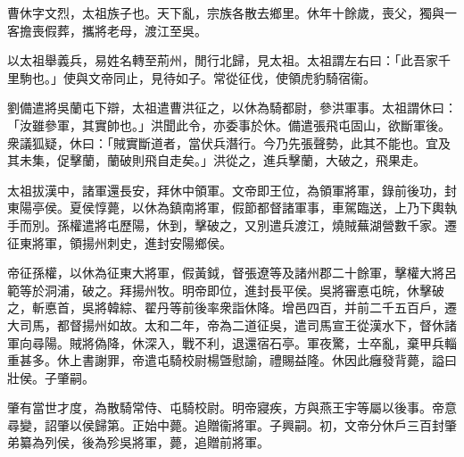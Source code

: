 \begin{pinyinscope}
 
 
 曹休字文烈，太祖族子也。天下亂，宗族各散去鄉里。休年十餘歲，喪父，獨與一客擔喪假葬，攜將老母，渡江至吳。
 
 
 以太祖舉義兵，易姓名轉至荊州，閒行北歸，見太祖。太祖謂左右曰：「此吾家千里駒也。」使與文帝同止，見待如子。常從征伐，使領虎豹騎宿衞。
 
 
 
 
 劉備遣將吳蘭屯下辯，太祖遣曹洪征之，以休為騎都尉，參洪軍事。太祖謂休曰：「汝雖參軍，其實帥也。」洪聞此令，亦委事於休。備遣張飛屯固山，欲斷軍後。衆議狐疑，休曰：「賊實斷道者，當伏兵潛行。今乃先張聲勢，此其不能也。宜及其未集，促擊蘭，蘭破則飛自走矣。」洪從之，進兵擊蘭，大破之，飛果走。
 
 
太祖拔漢中，諸軍還長安，拜休中領軍。文帝即王位，為領軍將軍，錄前後功，封東陽亭侯。夏侯惇薨，以休為鎮南將軍，假節都督諸軍事，車駕臨送，上乃下輿執手而別。孫權遣將屯歷陽，休到，擊破之，又別遣兵渡江，燒賊蕪湖營數千家。遷征東將軍，領揚州刺史，進封安陽鄉侯。
 
 
帝征孫權，以休為征東大將軍，假黃鉞，督張遼等及諸州郡二十餘軍，擊權大將呂範等於洞浦，破之。拜揚州牧。明帝即位，進封長平侯。吳將審悳屯皖，休擊破之，斬悳首，吳將韓綜、翟丹等前後率衆詣休降。增邑四百，并前二千五百戶，遷大司馬，都督揚州如故。太和二年，帝為二道征吳，遣司馬宣王從漢水下，督休諸軍向尋陽。賊將偽降，休深入，戰不利，退還宿石亭。軍夜驚，士卒亂，棄甲兵輜重甚多。休上書謝罪，帝遣屯騎校尉楊曁慰諭，禮賜益隆。休因此癰發背薨，謚曰壯侯。子肇嗣。
 
 
肇有當世才度，為散騎常侍、屯騎校尉。明帝寢疾，方與燕王宇等屬以後事。帝意尋變，詔肇以侯歸第。正始中薨。追贈衞將軍。子興嗣。初，文帝分休戶三百封肇弟纂為列侯，後為殄吳將軍，薨，追贈前將軍。
 
 
\end{pinyinscope}